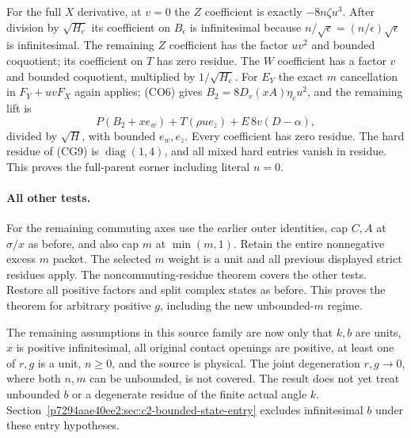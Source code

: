 For the full $X$ derivative, at $v=0$ the $Z$ coefficient is exactly
$-8n\zeta u^3$.  After division by $\sqrt{H_c}$ its coefficient
on $B_\epsilon$ is infinitesimal because
$n/\sqrt\epsilon=(n/\epsilon)\sqrt\epsilon$ is infinitesimal.
The remaining $Z$ coefficient has the factor $uv^2$ and bounded
coquotient; its coefficient on $T$ has zero residue.  The $W$
coefficient has a factor $v$ and bounded coquotient, multiplied by
$1/\sqrt{H_c}$.  For $E_Y$ the exact $m$ cancellation in
$F_Y+uvF_X$ again applies; (CO6) gives
$B_2=8D_v(xA)\eta_c u^2$, and the remaining lift is
\[
 P(B_2+xe_w)+T(\rho u e_z)+E\,8v(D-\alpha),
\]
divided by $\sqrt H$, with bounded $e_w,e_z$.
Every coefficient has zero residue.  The hard residue of (CG9) is
$\operatorname{diag}(1,4)$, and all mixed hard entries vanish in
residue.  This proves the full-parent corner including literal $n=0$.

\paragraph{All other tests.}
For the remaining commuting axes use the earlier outer identities,
cap $C,A$ at $\sigma/x$ as before, and also cap $m$ at
$\min(m,1)$.  Retain the entire nonnegative excess $m$ packet.
The selected $m$ weight is a unit and all previous displayed
strict residues apply.  The noncommuting-residue theorem covers
the other tests.  Restore all positive factors and split complex
states as before.  This proves the theorem for arbitrary positive
$g$, including the new unbounded-$m$ regime.

The remaining assumptions in this source family are now only that
$k,b$ are units, $x$ is positive infinitesimal, all original contact
openings are positive, at least one of $r,g$ is a unit, $n\geq0$,
and the source is physical.  The joint degeneration $r,g\to0$,
where both $n,m$ can be unbounded, is not covered.  The
result does not yet treat unbounded $b$ or a degenerate residue of
the finite actual angle $k$.  Section~\ref{p7294aae40ee2:sec:c2-bounded-state-entry}
excludes infinitesimal $b$ under these entry hypotheses.
